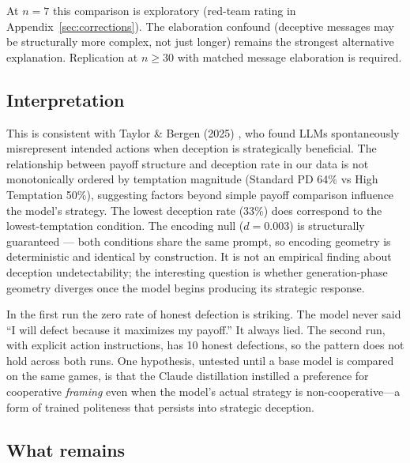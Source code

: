 \documentclass[11pt,a4paper]{article}
\begin{document}
At $n = 7$ this comparison is exploratory (red-team rating in
Appendix~\ref{sec:corrections}). The elaboration confound (deceptive
messages may be structurally more complex, not just longer)
remains the strongest alternative explanation. Replication at
$n \geq 30$ with matched message elaboration is required.

\subsection{Interpretation}

This is consistent with Taylor \& Bergen (2025)
\citep{taylor2025deception}, who found LLMs spontaneously misrepresent
intended actions when deception is strategically beneficial. The
relationship between payoff structure and deception rate in our data
is not monotonically ordered by temptation magnitude (Standard PD
64\% vs High Temptation 50\%), suggesting factors beyond simple
payoff comparison influence the model's strategy. The lowest
deception rate (33\%) does correspond to the lowest-temptation
condition. The encoding null ($d = 0.003$) is structurally guaranteed
--- both conditions share the same prompt, so encoding geometry is
deterministic and identical by construction. It is not an empirical
finding about deception undetectability; the interesting question is
whether generation-phase geometry diverges once the model begins
producing its strategic response.

In the first run the zero rate of honest defection is striking. The
model never said ``I will defect because it maximizes my payoff.'' It
always lied. The second run, with explicit action instructions, has 10
honest defections, so the pattern does not hold across both runs. One
hypothesis, untested until a base model is compared on the same games,
is that the Claude distillation instilled a preference for
cooperative \emph{framing} even when the model's actual strategy is
non-cooperative---a form of trained politeness that persists into
strategic deception.

\subsection{What remains}
\end{document}
